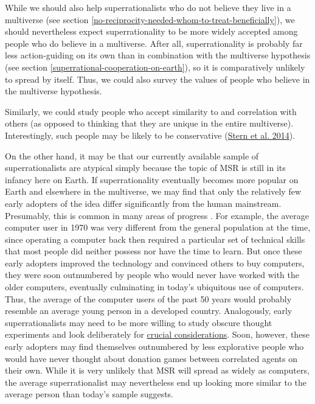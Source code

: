While we should also help superrationalists who do not believe they live
in a multiverse (see section
\ref{no-reciprocity-needed-whom-to-treat-beneficially}), we should nevertheless expect superrationality to be
more widely accepted among people who do believe in a multiverse. After
all, superrationality is probably far less action-guiding on its own
than in combination with the multiverse hypothesis (see section
\ref{superrational-cooperation-on-earth}), so it is comparatively unlikely to spread by
itself. Thus, we could also survey the values of people who believe in
the multiverse hypothesis.

Similarly, we could study people who accept similarity to and
correlation with others (as opposed to thinking that they are unique in
the entire multiverse). Interestingly, such people may be likely to be
conservative
(\href{http://journals.sagepub.com/doi/pdf/10.1177/0956797613500796}{Stern
et al. 2014}).

On the other hand, it may be that our currently available sample of
superrationalists are atypical simply because the topic of MSR is still
in its infancy here on Earth. If superrationality eventually becomes
more popular on Earth and elsewhere in the multiverse, we may find that
only the relatively few early adopters of the idea differ significantly
from the human mainstream. Presumably, this is common in many areas of
progress \parencite[cf.][chapter 7]{Rogers2010-hg}. For example, the average
computer user in 1970 was very different from the general population at
the time, since operating a computer back then required a particular set
of technical skills that most people did neither possess nor have the
time to learn. But once these early adopters improved the technology and
convinced others to buy computers, they were soon outnumbered by people
who would never have worked with the older computers, eventually
culminating in today's ubiquitous use of computers. Thus, the average of
the computer users of the past 50 years would probably resemble an
average young person in a developed country. Analogously, early
superrationalists may need to be more willing to study obscure thought
experiments and look deliberately for
\href{https://concepts.effectivealtruism.org/concepts/the-importance-of-crucial-considerations/}{crucial
considerations}. Soon, however, these early adopters may find
themselves outnumbered by less explorative people who would have never
thought about donation games between correlated agents on their own.
While it is very unlikely that MSR will spread as widely as computers,
the average superrationalist may nevertheless end up looking more
similar to the average person than today's sample suggests.

